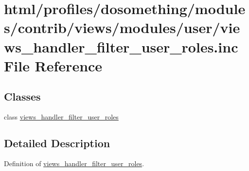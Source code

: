 \hypertarget{views__handler__filter__user__roles_8inc}{
\section{html/profiles/dosomething/modules/contrib/views/modules/user/views\_\-handler\_\-filter\_\-user\_\-roles.inc File Reference}
\label{views__handler__filter__user__roles_8inc}
}
\subsection*{Classes}
\begin{DoxyCompactItemize}
\item 
class \hyperlink{classviews__handler__filter__user__roles}{views\_\-handler\_\-filter\_\-user\_\-roles}
\end{DoxyCompactItemize}


\subsection{Detailed Description}
Definition of \hyperlink{classviews__handler__filter__user__roles}{views\_\-handler\_\-filter\_\-user\_\-roles}. 